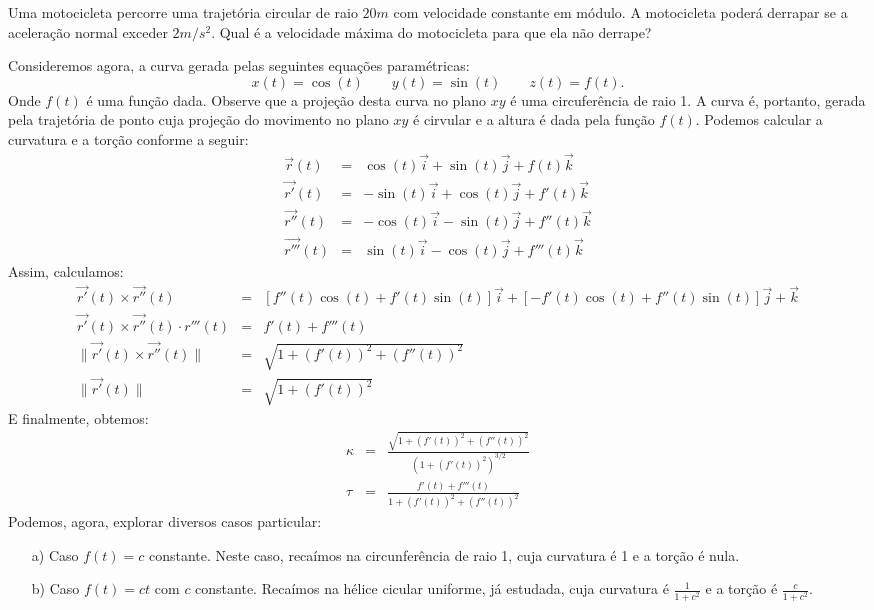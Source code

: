\begin{ex}Uma motocicleta percorre uma trajetória circular de raio $20m$ com velocidade constante em módulo. A motocicleta poderá derrapar se a aceleração normal exceder $2m/s^2$. Qual é a velocidade máxima do motocicleta para que ela não derrape?
\end{ex}

\begin{ex} Consideremos agora, a curva gerada pelas seguintes equações paramétricas:
$$x(t)=\cos(t)\qquad y(t)=\sin(t)\qquad z(t)=f(t).$$
 Onde $f(t)$ é uma função dada. Observe que a projeção desta curva no plano $xy$ é uma circuferência de raio 1. A curva é, portanto, gerada pela trajetória de ponto cuja projeção do movimento no plano $xy$ é cirvular e a altura é dada pela função $f(t)$. Podemos calcular a curvatura e a torção conforme a seguir:
 \begin{eqnarray*}
  \vec{r}(t)&=&\cos(t)\vec{i}+\sin(t)\vec{j}+f(t)\vec{k}\\
  \vec{r'}(t)&=&-\sin(t)\vec{i}+\cos(t)\vec{j}+f'(t)\vec{k}\\
  \vec{r''}(t)&=&-\cos(t)\vec{i}-\sin(t)\vec{j}+f''(t)\vec{k}\\
  \vec{r'''}(t)&=&\sin(t)\vec{i}-\cos(t)\vec{j}+f'''(t)\vec{k}
 \end{eqnarray*}
Assim, calculamos:
 \begin{eqnarray*}
  \vec{r'}(t)\times\vec{r''}(t) &=&\left[f''(t)\cos(t)+f'(t)\sin(t)\right]\vec{i}+\left[-f'(t)\cos(t)+f''(t)\sin(t)\right]\vec{j}+\vec{k}\\
 \vec{r'}(t)\times\vec{r''}(t)\cdot r'''(t)&=&f'(t)+f'''(t)\\
 \|\vec{r'}(t)\times\vec{r''}(t)\|&=&\sqrt{1+\left(f'(t)\right)^2+\left(f''(t)\right)^2}\\
 \|\vec{r'}(t)\|&=&\sqrt{1+\left(f'(t)\right)^2}
 \end{eqnarray*}
E finalmente, obtemos:
 \begin{eqnarray*}
\kappa&=&\frac{\sqrt{1+\left(f'(t)\right)^2+\left(f''(t)\right)^2}}{\left({1+\left(f'(t)\right)^2}\right)^{3/2}}\\
\tau&=&\frac{f'(t)+f'''(t)}{1+\left(f'(t)\right)^2+\left(f''(t)\right)^2}
 \end{eqnarray*}
Podemos, agora, explorar diversos casos particular:
\begin{itemize}
 \item [a)] Caso $f(t)=c$ constante. Neste caso, recaímos na circunferência de raio 1, cuja curvatura é 1 e a torção é nula.
 \item [b)] Caso $f(t)=ct$ com $c$ constante. Recaímos na hélice cicular uniforme, já estudada, cuja curvatura é $\frac{1}{1+c^2}$ e a torção é $\frac{c}{1+c^2}$.

\end{itemize}
\end{ex}
